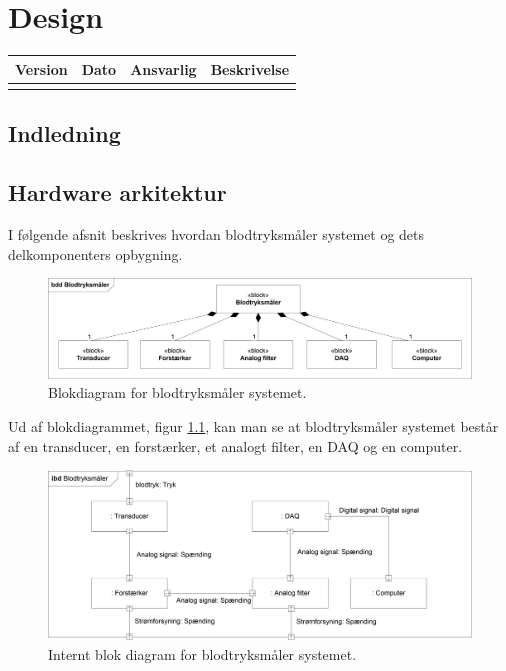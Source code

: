 \chapter{Design}

\begin{longtabu} to 
    Version &    Dato &    Ansvarlig &    Beskrivelse\\[-1ex]
    \midrule
    
\label{version_Systemark}
\end{longtabu}

\section{Indledning}

  
\section{Hardware arkitektur}
I følgende afsnit beskrives hvordan blodtryksmåler systemet og dets delkomponenters opbygning.
\\
\begin{figure}[H]
	\centering
	\includegraphics[width=1\textwidth]{Figurer/Hardware/BDD1}
	\caption{Blokdiagram for blodtryksmåler systemet.}
	\label{BDD blodtryksmaaler}
\end{figure}

Ud af blokdiagrammet, figur \ref{BDD blodtryksmaaler}, kan man se at blodtryksmåler systemet består af en transducer, en forstærker, et analogt filter, en DAQ og en computer.\\
\begin{figure}[H]
	\centering
	\includegraphics[width=1\textwidth]{Figurer/Hardware/IBD}
	\caption{Internt blok diagram for blodtryksmåler systemet.}
	\label{IBD blodtryksmaaler}
\end{figure}

